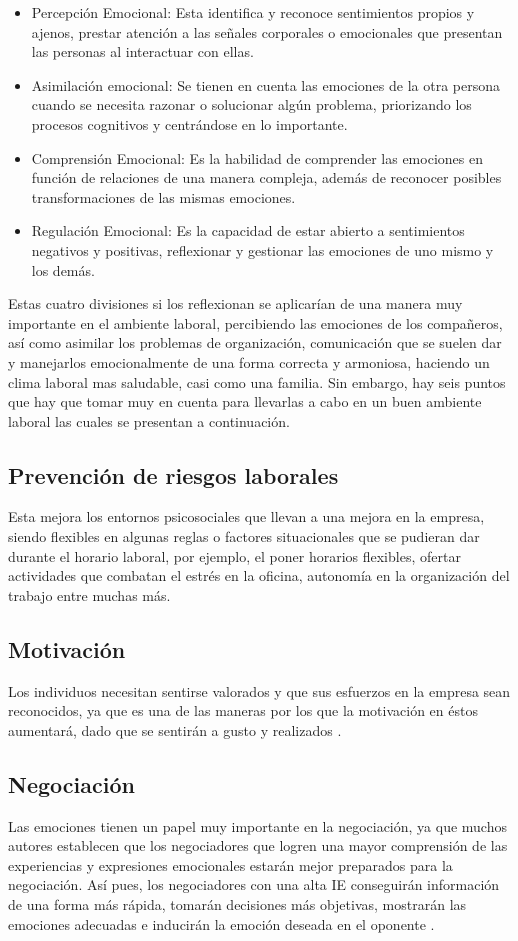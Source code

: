 \begin{itemize}
\item Percepción Emocional: Esta identifica y reconoce sentimientos propios y
ajenos, prestar atención a las señales corporales o emocionales que presentan
las personas al interactuar con ellas. 
\item Asimilación emocional: Se tienen en cuenta las emociones de la otra
persona cuando se necesita razonar o solucionar algún problema, priorizando los
procesos cognitivos y centrándose en lo importante.
\item Comprensión Emocional: Es la habilidad de comprender las emociones en
función de relaciones de una manera compleja, además de reconocer posibles
transformaciones de las mismas emociones.
\item Regulación Emocional: Es la capacidad de estar abierto a sentimientos
negativos y positivas, reflexionar y gestionar las emociones de uno mismo y los
demás.
\end{itemize}
Estas cuatro divisiones si los reflexionan se aplicarían de una manera muy
importante en el ambiente laboral, percibiendo las emociones de los compañeros,
así como asimilar los problemas de organización, comunicación que se suelen dar
y manejarlos emocionalmente de una forma correcta y armoniosa, haciendo un clima
laboral mas saludable, casi como una familia. Sin embargo, hay seis puntos que
hay que tomar muy en cuenta para llevarlas a cabo en un buen ambiente laboral
las cuales se presentan a continuación.
\subsection{Prevención de riesgos laborales}
Esta mejora los entornos psicosociales que llevan a una mejora en la empresa,
siendo flexibles en algunas reglas o factores situacionales que se pudieran dar
durante el horario laboral, por ejemplo, el poner horarios flexibles, ofertar
actividades que combatan el estrés en la oficina, autonomía en la organización
del trabajo entre muchas más.
\subsection{Motivación}
Los individuos necesitan sentirse valorados y que sus esfuerzos en la empresa
sean reconocidos, ya que es una de las maneras por los que la motivación en
éstos aumentará, dado que se sentirán a gusto y realizados \parencite{ayuso2016}.
\subsection{Negociación}
Las emociones tienen un papel muy importante en la negociación, ya que muchos
autores establecen que los negociadores que logren una mayor comprensión de las
experiencias y expresiones emocionales estarán mejor preparados para la
negociación. Así pues, los negociadores con una alta IE conseguirán información
de una forma más rápida, tomarán decisiones más objetivas, mostrarán las
emociones adecuadas e inducirán la emoción deseada en el oponente
\parencite{ayuso2016}.
